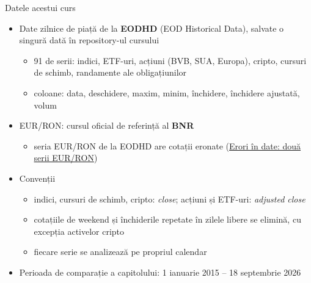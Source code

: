 \begin{frame}{Datele acestui curs}
\itemsize{\small}
\begin{itemize}
    \item Date zilnice de piață de la \textbf{EODHD} (EOD Historical Data), salvate o singură dată în repository-ul cursului
    \begin{itemize}
        \item 91 de serii: indici, ETF-uri, acțiuni (BVB, SUA, Europa), cripto, cursuri de schimb, randamente ale obligațiunilor
        \item coloane: data, deschidere, maxim, minim, închidere, închidere ajustată, volum
    \end{itemize}
    \item EUR/RON: cursul oficial de referință al \textbf{BNR}
    \begin{itemize}
        \item seria EUR/RON de la EODHD are cotații eronate (\hyperlink{ch1-eurron}{\textcolor{MainBlue}{Erori în date: două serii EUR/RON}})
    \end{itemize}
    \item Convenții
    \begin{itemize}
        \item indici, cursuri de schimb, cripto: \textit{close}; acțiuni și ETF-uri: \textit{adjusted close}
        \item cotațiile de weekend și închiderile repetate în zilele libere se elimină, cu excepția activelor cripto
        \item fiecare serie se analizează pe propriul calendar
    \end{itemize}
    \item Perioada de comparație a capitolului: 1 ianuarie 2015 -- 18 septembrie 2026
\end{itemize}
\end{frame}

